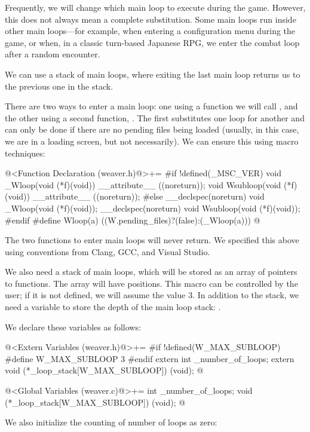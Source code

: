 
Frequently, we will change which main loop to execute during the
game. However, this does not always mean a complete substitution. Some
main loops run inside other main loops---for example, when entering a
configuration menu during the game, or when, in a classic turn-based
Japanese RPG, we enter the combat loop after a random encounter.

We can use a stack of main loops, where exiting the last main loop
returns us to the previous one in the stack.

There are two ways to enter a main loop: one using a function we will
call , and the other using a second
function, . The first substitutes one loop for
another and can only be done if there are no pending files being
loaded (usually, in this case, we are in a loading screen, but not
necessarily). We can ensure this using macro techniques:

\iniciocodigo
@<Function Declaration (weaver.h)@>+=
#if !defined(_MSC_VER)
void _Wloop(void (*f)(void)) __attribute__ ((noreturn));
void Wsubloop(void (*f)(void)) __attribute__ ((noreturn));
#else
__declspec(noreturn) void _Wloop(void (*f)(void));
__declspec(noreturn) void Wsubloop(void (*f)(void));
#endif
#define Wloop(a) ((W.pending_files)?(false):(_Wloop(a)))
@
\fimcodigo

The two functions to enter main loops will never return. We specified
this above using conventions from Clang, GCC, and Visual Studio.

We also need a stack of main loops, which will be stored as an array
of pointers to functions. The array will
have  positions. This macro can be
controlled by the user; if it is not defined, we will assume the value
3. In addition to the stack, we need a variable to store the depth of
the main loop stack: .

We declare these variables as follows:

\iniciocodigo
@<Extern Variables (weaver.h)@>+=
#if !defined(W_MAX_SUBLOOP)
#define W_MAX_SUBLOOP 3
#endif
extern int _number_of_loops;
extern void (*_loop_stack[W_MAX_SUBLOOP]) (void);
@
\fimcodigo

\iniciocodigo
@<Global Variables (weaver.c)@>+=
int _number_of_loops;
void (*_loop_stack[W_MAX_SUBLOOP]) (void);
@
\fimcodigo

We also initialize the counting of number of loops as zero:

